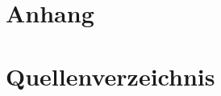 \documentclass[12pt, titlepage]{article}
\begin{document}


\doublespacing




















\newpage
\section{Anhang}

\newpage
\section{Quellenverzeichnis}
\printbibliography

\newpage
\end{document}
